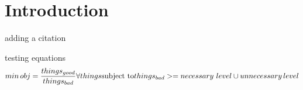 \section{Introduction}

adding a citation \cite{Pouransari_2014}

testing equations
\begin{equation}
min \, obj= \frac{things_{good}}{things_{bad}} \forall things\\
\text{subject to}  \\
things_{bad}>=necessary\,\, level \cup unnecessary \, level
\end{equation}